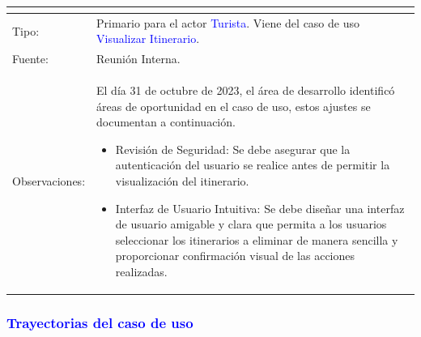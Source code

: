 \begin{tabularx}{16cm}{||l|X||}
{\begin{itemize}
        \end{itemize}}\\
	\hline
	{Tipo:} & Primario para el actor {\textcolor{blue}{Turista}}. Viene del caso de uso {\textcolor{blue}{Visualizar Itinerario}}.\\
	\hline
	{Fuente:} & Reunión Interna. \\
	\hline
	{Observaciones:} & El día 31 de octubre de 2023, el área de desarrollo identificó áreas de oportunidad en el caso de uso, estos ajustes se documentan a continuación.
    \begin{itemize}
        \item Revisión de Seguridad: Se debe asegurar que la autenticación del usuario se realice antes de permitir la visualización del itinerario.
        \item Interfaz de Usuario Intuitiva: Se debe diseñar una interfaz de usuario amigable y clara que permita a los usuarios seleccionar los itinerarios a eliminar de manera sencilla y proporcionar confirmación visual de las acciones realizadas.
    \end{itemize}\\
	\hline
\end{tabularx}
\vspace{300pt}
\subsubsection{\textcolor{blue}{Trayectorias del caso de uso}}

